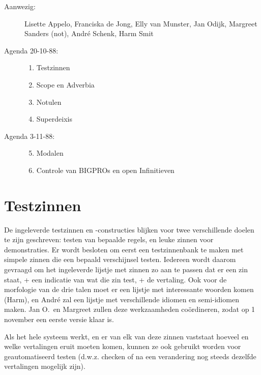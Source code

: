 
   \RosSupersedes{-}
   \MakeRosTitle
%
%
\begin{description}
\item[Aanwezig:] Lisette Appelo, Franciska de Jong, Elly van Munster, Jan Odijk,
                 Margreet Sanders (not), Andr\'{e} Schenk, Harm Smit
\item[Agenda 20-10-88:]\mbox{}
  \begin{enumerate}
  \item Testzinnen
  \item Scope en Adverbia
  \item Notulen
  \item Superdeixis
  \end{enumerate}
\item[Agenda 3-11-88:]\mbox{}
  \begin{enumerate}
  \setcounter{enumi}{4}
  \item Modalen
  \item Controle van BIGPROs en open Infinitieven
  \end{enumerate}
\end{description}

\section{Testzinnen}
De ingeleverde testzinnen en -constructies blijken voor twee verschillende 
doelen te 
zijn geschreven: testen van bepaalde regels, en leuke zinnen voor 
demonstraties. Er wordt besloten om eerst een testzinnenbank te maken
met simpele zinnen die een bepaald verschijnsel testen. Iedereen wordt 
daarom gevraagd om het ingeleverde lijstje met zinnen zo aan te passen dat er 
een zin staat, + een indicatie van wat die zin test, + de vertaling. Ook 
voor de morfologie van de drie talen moet er een lijstje met interessante 
woorden komen (Harm),
en Andr\'{e} zal een lijstje met verschillende idiomen en semi-idiomen maken.
Jan O.\ en Margreet zullen deze werkzaamheden co\"{o}rdineren, zodat op 1 
november een eerste versie klaar is.

Als het hele systeem werkt, en er van elk van deze zinnen vaststaat hoeveel
en welke vertalingen eruit moeten komen, kunnen ze ook gebruikt worden
voor geautomatiseerd testen (d.w.z. checken of na een verandering nog steeds 
dezelfde vertalingen mogelijk zijn).

